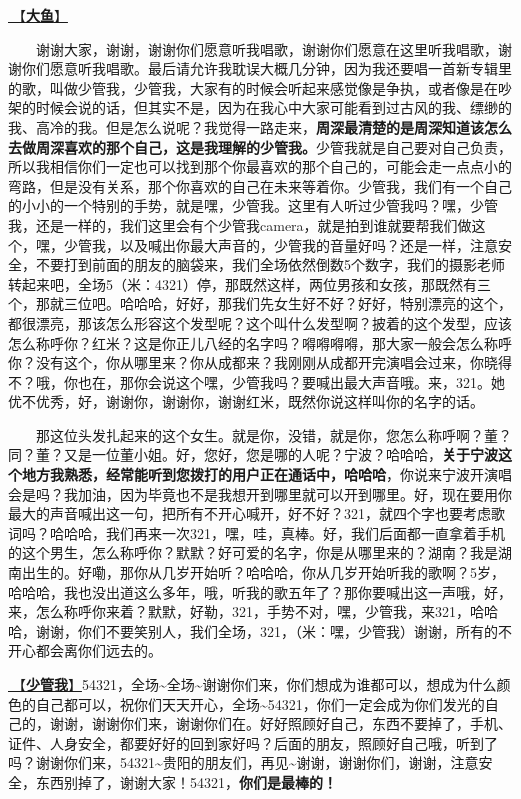 \documentclass[]{ctexbook}
\begin{document}
\hyperref[big-fish]{🎵【\textbf{大鱼}】}

  谢谢大家，谢谢，谢谢你们愿意听我唱歌，谢谢你们愿意在这里听我唱歌，谢谢你们愿意听我唱歌。最后请允许我耽误大概几分钟，因为我还要唱一首新专辑里的歌，叫做少管我，少管我，大家有的时候会听起来感觉像是争执，或者像是在吵架的时候会说的话，但其实不是，因为在我心中大家可能看到过古风的我、缥缈的我、高冷的我。但是怎么说呢？我觉得一路走来，\textbf{周深最清楚的是周深知道该怎么去做周深喜欢的那个自己，这是我理解的少管我。}少管我就是自己要对自己负责，所以我相信你们一定也可以找到那个你最喜欢的那个自己的，可能会走一点点小的弯路，但是没有关系，那个你喜欢的自己在未来等着你。少管我，我们有一个自己的小小的一个特别的手势，就是嘿，少管我。这里有人听过少管我吗？嘿，少管我，还是一样的，我们这里会有个少管我camera，就是拍到谁就要帮我们做这个，嘿，少管我，以及喊出你最大声音的，少管我的音量好吗？还是一样，注意安全，不要打到前面的朋友的脑袋来，我们全场依然倒数5个数字，我们的摄影老师转起来吧，全场5（米：4321）停，那既然这样，两位男孩和女孩，那既然有三个，那就三位吧。哈哈哈，好好，那我们先女生好不好？好好，特别漂亮的这个，都很漂亮，那该怎么形容这个发型呢？这个叫什么发型啊？披着的这个发型，应该怎么称呼你？红米？这是你正儿八经的名字吗？嘚嘚嘚嘚，那大家一般会怎么称呼你？没有这个，你从哪里来？你从成都来？我刚刚从成都开完演唱会过来，你晓得不？哦，你也在，那你会说这个嘿，少管我吗？要喊出最大声音哦。来，321。她优不优秀，好，谢谢你，谢谢你，谢谢红米，既然你说这样叫你的名字的话。

  那这位头发扎起来的这个女生。就是你，没错，就是你，您怎么称呼啊？董？同？董？又是一位董小姐。好，您好，您是哪的人呢？宁波？哈哈哈，\textbf{关于宁波这个地方我熟悉，经常能听到您拨打的用户正在通话中，哈哈哈}，你说来宁波开演唱会是吗？我加油，因为毕竟也不是我想开到哪里就可以开到哪里。好，现在要用你最大的声音喊出这一句，把所有不开心喊开，好不好？321，就四个字也要考虑歌词吗？哈哈哈，我们再来一次321，嘿，哇，真棒。好，我们后面都一直拿着手机的这个男生，怎么称呼你？默默？好可爱的名字，你是从哪里来的？湖南？我是湖南出生的。好嘞，那你从几岁开始听？哈哈哈，你从几岁开始听我的歌啊？5岁，哈哈哈，我也没出道这么多年，哦，听我的歌五年了？那你要喊出这一声哦，好，来，怎么称呼你来着？默默，好勒，321，手势不对，嘿，少管我，来321，哈哈哈，谢谢，你们不要笑别人，我们全场，321，（米：嘿，少管我）谢谢，所有的不开心都会离你们远去的。

\hyperref[watch-ur-manners]{🎵【\textbf{少管我}】}54321，全场\textasciitilde 全场\textasciitilde 谢谢你们来，你们想成为谁都可以，想成为什么颜色的自己都可以，祝你们天天开心，全场\textasciitilde54321，你们一定会成为你们发光的自己的，谢谢，谢谢你们来，谢谢你们在。好好照顾好自己，东西不要掉了，手机、证件、人身安全，都要好好的回到家好吗？后面的朋友，照顾好自己哦，听到了吗？谢谢你们来，54321\textasciitilde 贵阳的朋友们，再见\textasciitilde 谢谢，谢谢你们，谢谢，注意安全，东西别掉了，谢谢大家！54321，\textbf{你们是最棒的！}
\end{document}
